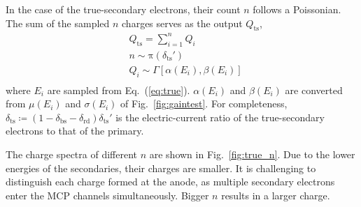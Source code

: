 In the case of the true-secondary electrons, their count $n$ follows a Poissonian. The sum of the sampled $n$ charges
serves as the output \(Q_{\mathrm{ts}}\),
\begin{equation}
	\label{eq:ts_all}
	\begin{aligned}
		 & Q_{\mathrm{ts}} = \sum_{i=1}^{n} Q_{i}            \\
		 & n \sim \mathrm{\pi}(\delta_{\mathrm{ts}}')        \\
		 & Q_{i} \sim \varGamma[\alpha(E_{i}), \beta(E_{i})] \\
	\end{aligned}
\end{equation}
where \(E_{i}\) are sampled from Eq.~(\ref{eq:true}).
$\alpha(E_{i})$ and $\beta(E_{i})$ are converted from
\(\mu(E_{i})\) and \(\sigma(E_{i})\) of Fig.~\ref{fig:gaintest}.
For completeness, \(\delta_\mathrm{ts} \coloneqq (1-\delta_{\mathrm{bs}} - \delta_{\mathrm{rd}})\delta_{\mathrm{ts}}'\)
is the electric-current ratio of the true-secondary electrons to that of the primary.

The charge spectra of different $n$ are shown in Fig.~\ref{fig:true_n}.
Due to the lower energies of the secondaries, their charges are smaller.
It is challenging to distinguish each charge formed at the anode,
as multiple secondary electrons enter the MCP channels simultaneously.
Bigger $n$ results in a larger charge.

